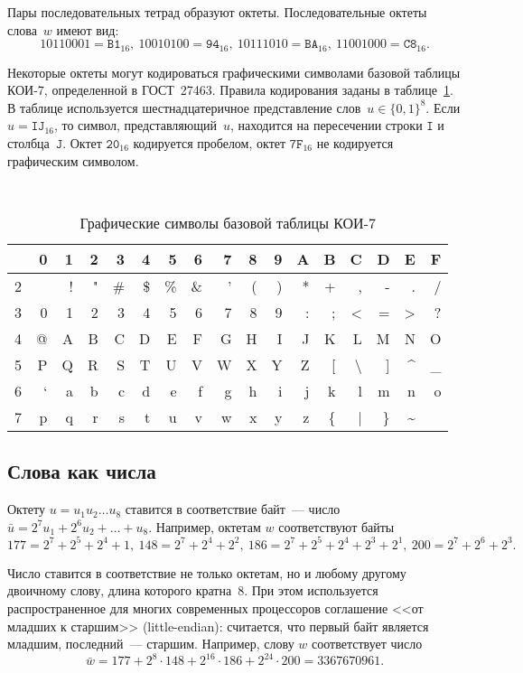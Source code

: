 Пары последовательных тетрад образуют октеты.
Последовательные октеты слова~$w$ имеют вид:
$$
1011 0001=\texttt{B1}_{16},\ 
1001 0100=\texttt{94}_{16},\ 
1011 1010=\texttt{BA}_{16},\  
1100 1000=\texttt{C8}_{16}.
$$

Некоторые октеты могут кодироваться графическими символами базовой 
таблицы КОИ-7, определенной в ГОСТ~27463. 
Правила кодирования заданы в таблице~\ref{Table.ASCII}.
%
В таблице используется шестнадцатеричное представление 
слов~$u\in\{0,1\}^8$. Если $u=\texttt{IJ}_{16}$, то символ, 
представляющий~$u$, находится на пересечении строки $\texttt{I}$ и 
столбца~$\texttt{J}$. 
%
Октет $\texttt{20}_{16}$ кодируется пробелом,
октет $\texttt{7F}_{16}$ не кодируется графическим символом.

\begin{table}[bht]
\caption{Графические символы базовой таблицы КОИ-7}\label{Table.ASCII}
{\small\tt
{\tabcolsep=8.5pt
\begin{tabular}{|l|rrrrrrrrrrrrrrrr|}
\hline
 &  0&  1&  2&  3&  4&  5&  6&  7&  8&  9&  A&  B&  C&  D&  E&  F\\
\hline
2&   &  !&  "&  \#& \$& \%& \&&  '&  (&  )&  *&  +&  ,&  -&  .&  /\\
3&  0&  1&  2&  3&  4&  5&  6&  7&  8&  9&  :&  ;&  <&  =&  >&  ?\\
4&  @&  A&  B&  C&  D&  E&  F&  G&  H&  I&  J&  K&  L&  M&  N&  O\\
5&  P&  Q&  R&  S&  T&  U&  V&  W&  X&  Y&  Z&  [& \textbackslash &]&\textasciicircum&\_\\
6&  `&  a&  b&  c&  d&  e&  f&  g&  h&  i&  j&  k&  l&  m&  n&  o\\
7&  p&  q&  r&  s&  t&  u&  v&  w&  x&  y&  z& \{&  |& \}&  \textasciitilde&   \\
\hline
\end{tabular}
} %
} %
\end{table}

\subsection{Слова как числа}

Октету $u=u_1 u_2\ldots u_8$ ставится в соответствие байт~--- 
число $\bar{u}=2^7u_1+2^6 u_2+\ldots + u_8$. 
Например, октетам $w$ соответствуют байты
$$
177=2^7+2^5+2^4+1,\ 
148=2^7+2^4+2^2,\ 
186=2^7+2^5+2^4+2^3+2^1,\ 
200=2^7+2^6+2^3.
$$

Число ставится в соответствие не только октетам, но и любому другому
двоичному слову, длина которого кратна~$8$. 
%
При этом используется распространенное для многих современных 
процессоров соглашение <<от младших к старшим>> (little-endian):
считается, что первый байт является младшим, последний~--- старшим.
Например, слову $w$ соответствует число
$$
\bar{w}=177+2^{8}\cdot 148+2^{16}\cdot 186+2^{24}\cdot 200 = 3367670961.
$$


